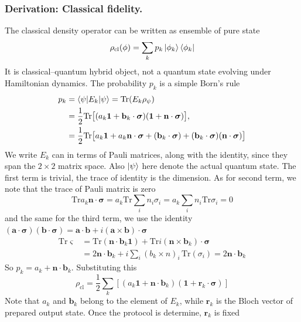\documentclass[../../../main.tex]{subfiles}
\begin{document}
\subsubsection{Derivation: Classical fidelity.}
The classical density operator can be written as ensemble of pure state
\begin{equation*}
  \rho_\text{cl} (\phi) = \sum_{k} p_k \ket{\phi_k} \bra{\phi_k}
\end{equation*}
It is classical–quantum hybrid object, not a quantum state evolving under Hamiltonian dynamics.
The probability $p_k$ is a simple Born's rule
\begin{align*}
  p_k & =  \braket{\psi  | E_k | \psi} = \mathrm{Tr} (E_k \rho_\psi)                                                                                                                                                        \\
      & =\frac{1 }{2} \mathrm{Tr}\big[(a_k \mathbf{1} +  \mathbf{b}_k\cdot \boldsymbol{\sigma})(\mathbf{1} + \mathbf{n}\cdot\boldsymbol{\sigma})\big],                                                                      \\
      & = \frac{1  }{2 }\mathrm{Tr}\big[a_k \mathbf{1} + a_k \mathbf{n }\cdot\boldsymbol{\sigma} + (\mathbf{b}_k\cdot\boldsymbol{\sigma}) + (\mathbf{b}_k\cdot\boldsymbol{\sigma})(\mathbf{n}\cdot\boldsymbol{\sigma})\big]
\end{align*}
We write $E_k$ can in terms of Pauli matrices, along with the identity, since they span the $2 \times 2$ matrix space.
Also $\ket{\psi}$ here denote the actual quantum state.
The first term is trivial, the trace of identity is the dimension.
As for second term, we note that the trace of Pauli matrix is zero
\begin{equation*}
  \mathrm{Tr} a_k \mathbf{n }\cdot \boldsymbol{\sigma} = a_k \mathrm{Tr} \sum_i n_i \sigma_i = a_k \sum_{i}  n_i  \mathrm{Tr} \sigma_i  = 0
\end{equation*}
and the same for the third term, we use the identity $    (\mathbf{a} \cdot \boldsymbol{\sigma})(\mathbf{b} \cdot \boldsymbol{\sigma}) = \mathbf{a} \cdot \mathbf{b} + i(\mathbf{a} \times \mathbf{b}) \cdot \boldsymbol{\sigma}$
\begin{align*}
  \mathrm{Tr} \varsigma & =  \mathrm{Tr} (\mathbf{n} \cdot \mathbf{b}_k \mathbf{1}) + \mathrm{Tr} i(\mathbf{n} \times \mathbf{b}_k) \cdot \boldsymbol{\sigma} \\
                        & =  2\mathbf{n} \cdot \mathbf{b}_k  +i \sum_i (b_k \times n)_i \,\mathrm{Tr}(\sigma_i)
  =  2\mathbf{n} \cdot \mathbf{b}_k
\end{align*}
So $p_k = a_k + \mathbf{n }\cdot \mathbf{b}_k$.
Substituting this
\begin{equation*}
  \rho_\text{cl} = \frac{1 }{2 }  \sum_k \left[ \left( a_k  \mathbf{1}+ \mathbf{n }\cdot \mathbf{b}_k \right)    (\mathbf{1 }+ \mathbf{r}_k \cdot \boldsymbol{\sigma})\right]
\end{equation*}
Note that $a_k$ and $\mathbf{b}_k$ belong to the element of $E_k$, while $\mathbf{r}_k$ is the Bloch vector of prepared output state.
Once the protocol is determine, $\mathbf{r}_k$ is fixed
\end{document}
